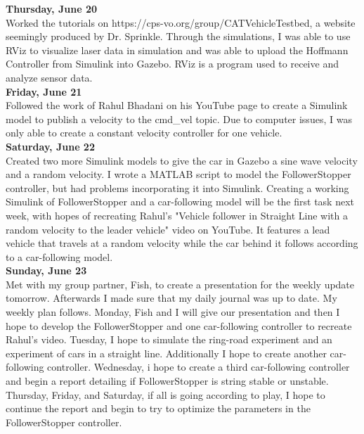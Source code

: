 \documentclass[12pt, letterpaper]{article}
\begin{document}
{\bf Thursday, June 20}\\
Worked the tutorials on https://cps-vo.org/group/CATVehicleTestbed, a website seemingly produced by Dr. Sprinkle. Through the simulations, I was able to use RViz to visualize laser data in simulation and was able to upload the Hoffmann Controller from Simulink into Gazebo. RViz is a program used to receive and analyze sensor data.\\

{\bf Friday, June 21}\\
Followed the work of Rahul Bhadani on his YouTube page to create a Simulink model to publish a velocity to the cmd\_vel topic. Due to computer issues, I was only able to create a constant velocity controller for one vehicle.\\

{\bf Saturday, June 22}\\
Created two more Simulink models to give the car in Gazebo a sine wave velocity and a random velocity. I wrote a MATLAB script to model the FollowerStopper controller, but had problems incorporating it into Simulink. Creating a working Simulink of FollowerStopper and a car-following model will be the first task next week, with hopes of recreating Rahul's "Vehicle follower in Straight Line with a random velocity to the leader vehicle" video on YouTube. It features a lead vehicle that travels at a random velocity while the car behind it follows according to a car-following model.\\

{\bf Sunday, June 23}\\
Met with my group partner, Fish, to create a presentation for the weekly update tomorrow. Afterwards I made sure that my daily journal was up to date. My weekly plan follows. Monday, Fish and I will give our presentation and then I hope to develop the FollowerStopper and one car-following controller to recreate Rahul's video. Tuesday, I hope to simulate the ring-road experiment and an experiment of cars in a straight line. Additionally I hope to create another car-following controller. Wednesday, i hope to create a third car-following controller and begin a report detailing if FollowerStopper is string stable or unstable. Thursday, Friday, and Saturday, if all is going according to play, I hope to continue the report and begin to try to optimize the parameters in the FollowerStopper controller.

\pagebreak

\end{document}

